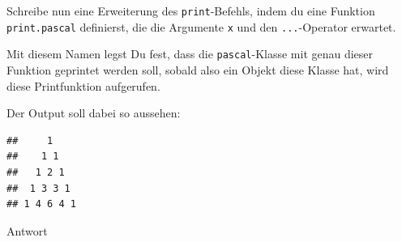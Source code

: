 \documentclass[
]{book}
\newenvironment{Shaded}{\begin{snugshade}}{\end{snugshade}}
\newcommand{\ControlFlowTok}[1]{\textcolor[rgb]{0.13,0.29,0.53}{\textbf{#1}}}
\newcommand{\DecValTok}[1]{\textcolor[rgb]{0.00,0.00,0.81}{#1}}
\newcommand{\FunctionTok}[1]{\textcolor[rgb]{0.00,0.00,0.00}{#1}}
\newcommand{\NormalTok}[1]{#1}
\newcommand{\OtherTok}[1]{\textcolor[rgb]{0.56,0.35,0.01}{#1}}
\newcommand{\SpecialCharTok}[1]{\textcolor[rgb]{0.00,0.00,0.00}{#1}}
\newcommand{\StringTok}[1]{\textcolor[rgb]{0.31,0.60,0.02}{#1}}
\begin{document}
Schreibe nun eine Erweiterung des \texttt{print}-Befehls, indem du eine Funktion \texttt{print.pascal} definierst, die die Argumente \texttt{x} und den \texttt{...}-Operator erwartet.

Mit diesem Namen legst Du fest, dass die \texttt{pascal}-Klasse mit genau dieser Funktion geprintet werden soll, sobald also ein Objekt diese Klasse hat, wird diese Printfunktion aufgerufen.

Der Output soll dabei so aussehen:

\begin{verbatim}
##     1
##    1 1
##   1 2 1
##  1 3 3 1
## 1 4 6 4 1
\end{verbatim}

Antwort

\begin{Shaded}
\end{Shaded}
\end{document}
